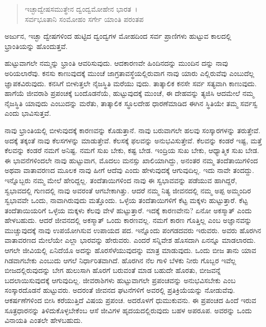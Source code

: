 \begin{verse}
ಇಚ್ಛಾದ್ವೇಷಸಮುತ್ಥೇನ ದ್ವಂದ್ವಮೋಹೇನ ಭಾರತ~।\\ಸರ್ವಭೂತಾನಿ ಸಂಮೋಹಂ ಸರ್ಗೇ ಯಾಂತಿ ಪರಂತಪ 
\end{verse}

{\small ಅರ್ಜುನ, ಇಚ್ಛಾ ದ್ವೇಷಗಳಿಂದ ಹುಟ್ಟಿದ ದ್ವಂದ್ವಗಳ ಮೋಹದಿಂದ ಸರ್ವ ಪ್ರಾಣಿಗಳು ಹುಟ್ಟುವ ಕಾಲದಲ್ಲಿ ಭ್ರಾಂತಿಯನ್ನು ಹೊಂದುತ್ತವೆ.}

ಹುಟ್ಟುವಾಗಲೇ ನಮ್ಮನ್ನು ಭ್ರಾಂತಿ ಆವರಿಸುವುದು. ಆದಕಾರಣವೇ ಹಿಂದಿನದನ್ನು ಮುಂದಿನ ದನ್ನು ನಾವು ಅರಿಯಲಾರೆವು. ಕನಸು ಕಾಣುವುದಕ್ಕೆ ಮುಂಚೆ ಜಾಗ್ರತಾವಸ್ಥೆಯಲ್ಲಿರುವಾಗ ನಾವು ಯಾರು ಎಲ್ಲಿರುವೆವು ಎಂಬುದೆಲ್ಲ ಜ್ಞಾಪಕವಿರುವುದು. ಕನಸಿಗೆ ಬೀಳುತ್ತಲೇ ನೈಜಸ್ಥಿತಿ ಮರೆಯು ವುದು. ತಾತ್ಕಾಲಿಕ ಕನಸೇ ಸರ್ವ ಸತ್ಯವಾಗಿ ಕಾಣುವುದು. ಹಾಗೆಯೆ ಜೀವರಾಶಿ ಪ್ರಪಂಚಕ್ಕೆ ಬಂದೊಡನೆಯೆ, ಹುಟ್ಟುವುದಕ್ಕೆ ಮುಂಚೆ, ಈ ದೇಹವನ್ನು ತ್ಯಜಿಸಿ ಆದಮೇಲೆ ನಮ್ಮ ನೈಜಸ್ಥಿತಿ ಯಾವುದು ಎಂಬುದನ್ನು ಮರೆತು, ತಾತ್ಕಾಲಿಕ ಸ್ಥೂಲದೇಹ ಧಾರಣೆಮಾಡಿದ ಈಗಿನ ಸ್ಥಿತಿಯೇ ತಮ್ಮ ಸರ್ವಸ್ವ ಎಂದು ಭಾವಿಸುತ್ತವೆ.

ನಾವು ಭ್ರಾಂತಿಯಲ್ಲಿ ಬೀಳುವುದಕ್ಕೆ ಕಾರಣವನ್ನು ಕೊಡುತ್ತಾನೆ. ನಾವು ಬರುವಾಗಲೇ ಹಲವು ಸಂಸ್ಕಾರಗಳನ್ನು ತರುತ್ತೇವೆ. ಅದಕ್ಕೆ ತಕ್ಕಂತೆ ನಾವು ಕೆಲಸಗಳನ್ನು ಮಾಡುತ್ತೇವೆ. ಕೆಲಸಕ್ಕೆ ಫಲವನ್ನು ಅನುಭವಿಸುತ್ತೇವೆ. ಕೆಲವನ್ನು ಕಂಡರೆ ಇಷ್ಟ, ಮತ್ತೆ ಕೆಲವನ್ನು ಕಂಡರೆ ನಮಗೆ ಅನಿಷ್ಟ. ನಮಗೆ ಸುಖ ಬೇಕು, ಕಷ್ಟ ಬೇಡ. ಇಂದ್ರಿಯ ಸುಖ ಬೇಕು, ಆಧ್ಯಾತ್ಮಿಕ ಸುಖ ಬೇಡ. ಈ ಭಾವನೆಗಳಿಂದಲೇ ನಾವು ಹುಟ್ಟುವಾಗ, ಮೊದಲು ಮನಸ್ಸು ಖಾಲಿಯಾಗಿದ್ದು, ಅನಂತರ ನಮ್ಮ ತಂದೆತಾಯಿಗಳಿಂದ ಅಥವಾ ವಾತಾವರಣದ ಮೂಲಕ ನಾವು ಹೀಗೆ ಆದೆವು ಎಂದು ಹೇಳುವುದಕ್ಕೆ ಆಗುವುದಿಲ್ಲ. ಇದು ನಾವೇ ತಂದದ್ದು. ಇನ್ನೊಬ್ಬರು ನಮ್ಮ ಮೇಲೆ ಹೇರಿದ್ದಲ್ಲ. ತಂದೆತಾಯಿಗಳಿಂದ ನಾವು ಈ ಸ್ವಭಾವವನ್ನು ಪಡೆಯುವ ಹಾಗಿದ್ದರೆ, ಸ್ವಭಾವದಲ್ಲಿ ಗುಣದಲ್ಲಿ ನಾವು ಅವರಂತೆ ಆಗಬೇಕಾಗಿತ್ತು. ಆದರೆ ನಮ್ಮ ನಿತ್ಯ ಜೀವನದಲ್ಲಿ ನಮ್ಮ ಅಪ್ಪ ಅಮ್ಮಂದಿರ ಸ್ವಭಾವವೇ ಒಂದು, ನಾವಾಗಿರುವುದು ಮತ್ತೊಂದು. ಒಳ್ಳೆಯ ತಂದೆತಾಯಿಗಳಿಗೆ ಕೆಟ್ಟ ಮಕ್ಕಳು ಹುಟ್ಟುತ್ತಾರೆ. ಕೆಟ್ಟ ತಂದೆತಾಯಿಯರಿಗೆ ಒಳ್ಳೆಯ ಮಕ್ಕಳು ಕೆಲವು ವೇಳೆ ಹುಟ್ಟುತ್ತಾರೆ. ಇದಕ್ಕೆ ಕಾರಣವೇನು? ಏನೋ ಅಕಸ್ಮಾತ್ ಎಂದು ಹೇಳಬಹುದು. ಆದರೆ ಜೀವನದಲ್ಲಿ ಅಕಸ್ಮಾತ್ ಒಂದು ಕಾರಣವಲ್ಲ. ನಮಗೆ ಕಾರಣ ಗೊತ್ತಿಲ್ಲ ಎಂಬ ಅಜ್ಞಾನವನ್ನು ಮುಚ್ಚುವುದಕ್ಕೆ ನಾವು ಉಪಯೋಗಿಸುವ ಉಪಾಯದ ಪದ. ಇನ್ನೊಂದು ಪಂಗಡದವರು ಇರುವರು. ಅವರು ಹೊರಗಿನ ವಾತಾವರಣದ ಮೇಲೆಯೇ ಎಲ್ಲಾ ಭಾರವನ್ನು ಹೇರುವರು. ಎಂದರೆ ಸನ್ನಿವೇಶ ಹೊಸದಾಗಿ ಏನನ್ನೂ ಮಾಡಲಾರದು. ಆಗಲೇ ಜೀವಿಯಲ್ಲಿ ಏನಿದೆಯೊ ಅದನ್ನು ಹೊರಸೆಳೆಯುವುದನ್ನು ಮಾತ್ರ ಮಾಡುವುದು. ಒಂದು ಬೀಜ ತಾನು ಯಾವ ಗಿಡವಾಗಬೇಕು ಎಂಬುದು ಆಗಲೆ ನಿರ್ಧಾರಿತವಾಗಿದೆ. ಹೊರಗಿನ ನೆಲ ಗಾಳಿ ಬೆಳಕು ನೀರು ಗೊಬ್ಬರ ಇವೆಲ್ಲ ಬೀಜದಲ್ಲಿರುವುದನ್ನು ಬೇಗ ಹುಲುಸಾಗಿ ಹೊರಗೆ ಬರುವಂತೆ ಮಾಡ ಬಹುದೇ ಹೊರತು, ಬೀಜವನ್ನೆ ಬದಲಾಯಿಸುವುದಕ್ಕೆ ಆಗುವುದಿಲ್ಲ. ಜೀವರಾಶಿಗಳು ಹುಟ್ಟುವಾಗಲೇ ಪ್ರಪಂಚವನ್ನು ಅನುಭವಿಸಬೇಕು ಎಂಬ ಸಂಸ್ಕಾರದೊಡನೆ ಹುಟ್ಟುವರು. ಅದರಂತೆ ಜೀವನದ ಘಟನೆಗಳಿಗೆ ಅವರಲ್ಲಿ ಪ್ರತಿಕ್ರಿಯೆಯನ್ನು ನೋಡುವೆವು. ಆಕರ್ಷಣೆಗಳಿಂದ ಬೀಸಿ ಕರೆಯುತ್ತಿದೆ ವಿಷಯ ಪ್ರಪಂಚ. ಅದರೊಳಗೆ ಧುಮುಕುವನು. ಈ ಪ್ರಪಂಚದ ಹಿಂದೆ ಇರುವ ಸೂತ್ರಧಾರನನ್ನು ತಿಳಿದುಕೊಳ್ಳಬೇಕೆಂಬ ಆಸೆ ಜೀವಿಗಳ ಹೃದಯದಲ್ಲಿರುವುದು ಬಹಳ ಅಪರೂಪ. ಅವರನ್ನು ಒಂದು ವಿನಾಯತಿ  ಎಂತಲೇ ಹೇಳಬಹುದು.

